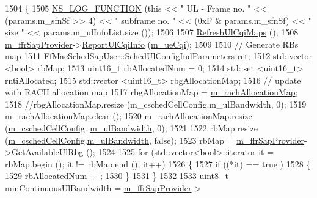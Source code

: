 \begin{DoxyCode}
1504 \{
1505   \hyperlink{log-macros-disabled_8h_a90b90d5bad1f39cb1b64923ea94c0761}{NS\_LOG\_FUNCTION} (\textcolor{keyword}{this} << \textcolor{stringliteral}{" UL - Frame no. "} << (params.m\_sfnSf >> 4) << \textcolor{stringliteral}{" subframe no. "} 
      << (0xF & params.m\_sfnSf) << \textcolor{stringliteral}{" size "} << params.m\_ulInfoList.size ());
1506 
1507   \hyperlink{classns3_1_1PfFfMacScheduler_a6256dfa03daee0f6fcff485dfb6914d4}{RefreshUlCqiMaps} ();
1508   \hyperlink{classns3_1_1PfFfMacScheduler_a40519746bd3f39a4b664db3036f2e3fd}{m\_ffrSapProvider}->\hyperlink{classns3_1_1LteFfrSapProvider_a14e6bcaf7db6afcb42f75122717313b1}{ReportUlCqiInfo} (\hyperlink{classns3_1_1PfFfMacScheduler_acf67c0074356c705e8bd89bb49ddd5ad}{m\_ueCqi});
1509 
1510   \textcolor{comment}{// Generate RBs map}
1511   FfMacSchedSapUser::SchedUlConfigIndParameters ret;
1512   std::vector <bool> rbMap;
1513   uint16\_t rbAllocatedNum = 0;
1514   std::set <uint16\_t> rntiAllocated;
1515   std::vector <uint16\_t> rbgAllocationMap;
1516   \textcolor{comment}{// update with RACH allocation map}
1517   rbgAllocationMap = \hyperlink{classns3_1_1PfFfMacScheduler_a755c1bfd84bd392a07aa370cb4ced071}{m\_rachAllocationMap};
1518   \textcolor{comment}{//rbgAllocationMap.resize (m\_cschedCellConfig.m\_ulBandwidth, 0);}
1519   \hyperlink{classns3_1_1PfFfMacScheduler_a755c1bfd84bd392a07aa370cb4ced071}{m\_rachAllocationMap}.clear ();
1520   \hyperlink{classns3_1_1PfFfMacScheduler_a755c1bfd84bd392a07aa370cb4ced071}{m\_rachAllocationMap}.resize (\hyperlink{classns3_1_1PfFfMacScheduler_a0be1f7a1e78824b031e48208b8af1048}{m\_cschedCellConfig}.
      \hyperlink{structns3_1_1FfMacCschedSapProvider_1_1CschedCellConfigReqParameters_a5ab5b102878e6e7e7727a14af4a64d2f}{m\_ulBandwidth}, 0);
1521 
1522   rbMap.resize (\hyperlink{classns3_1_1PfFfMacScheduler_a0be1f7a1e78824b031e48208b8af1048}{m\_cschedCellConfig}.\hyperlink{structns3_1_1FfMacCschedSapProvider_1_1CschedCellConfigReqParameters_a5ab5b102878e6e7e7727a14af4a64d2f}{m\_ulBandwidth}, \textcolor{keyword}{false});
1523   rbMap = \hyperlink{classns3_1_1PfFfMacScheduler_a40519746bd3f39a4b664db3036f2e3fd}{m\_ffrSapProvider}->\hyperlink{classns3_1_1LteFfrSapProvider_aafd23b22a27ec83e03d54795c122d175}{GetAvailableUlRbg} ();
1524 
1525   \textcolor{keywordflow}{for} (std::vector<bool>::iterator it = rbMap.begin (); it != rbMap.end (); it++)
1526     \{
1527       \textcolor{keywordflow}{if} ((*it) == true )
1528         \{
1529           rbAllocatedNum++;
1530         \}
1531     \}
1532 
1533   uint8\_t minContinuousUlBandwidth = \hyperlink{classns3_1_1PfFfMacScheduler_a40519746bd3f39a4b664db3036f2e3fd}{m\_ffrSapProvider}->

\end{DoxyCode}
